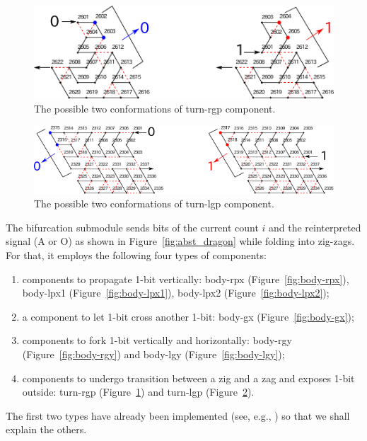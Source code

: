 \begin{figure}[h]
\centering
\includegraphics[width=0.7\linewidth]{pic/turn-rgp.pdf}
\caption{The possible two conformations of turn-rgp component.}
\label{fig:turn-rgp}
\end{figure}

\begin{figure}[h]
\centering
\includegraphics[width=0.8\linewidth]{pic/turn-lgp.pdf}
\caption{The possible two conformations of turn-lgp component.}
\label{fig:turn-lgp}
\end{figure}



The bifurcation submodule sends bits of the current count $i$ and the reinterpreted signal (A or O) as shown in Figure~\ref{fig:abst_dragon} while folding into zig-zags.
For that, it employs the following four types of components: 
\begin{enumerate}[itemsep=0pt]
\item components to propagate 1-bit vertically: body-rpx (Figure~\ref{fig:body-rpx}), body-lpx1 (Figure~\ref{fig:body-lpx1}), body-lpx2 (Figure~\ref{fig:body-lpx2}); 
\item a component to let 1-bit cross another 1-bit: body-gx (Figure~\ref{fig:body-gx}); 
\item components to fork 1-bit vertically and horizontally: body-rgy (Figure~\ref{fig:body-rgy}) and body-lgy (Figure~\ref{fig:body-lgy});  
\item components to undergo transition between a zig and a zag and exposes 1-bit outside: turn-rgp (Figure~\ref{fig:turn-rgp}) and turn-lgp (Figure~\ref{fig:turn-lgp}). 
\end{enumerate} 
The first two types have already been implemented (see, e.g., \cite{HaKiOtSe2016}) so that we shall explain the others.

